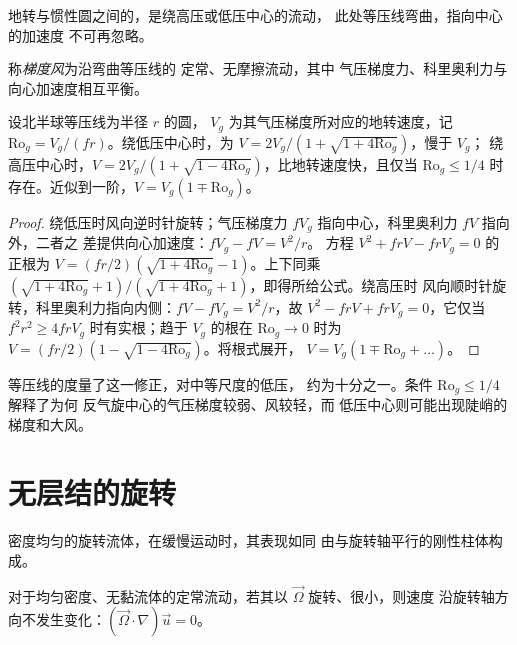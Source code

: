 地转与惯性圆之间的，是绕高压或低压中心的流动，
此处等压线弯曲，指向中心的加速度
不可再忽略。

\begin{definition}[梯度风]\label{def:b3:gfd-foundations:gradient}
称\emph{梯度风}为沿弯曲等压线的
定常、无摩擦流动，其中
气压梯度力、科里奥利力与向心加速度相互平衡。
\end{definition}

\begin{proposition}[曲率修正]\label{prop:b3:gfd-foundations:gradient}
设北半球等压线为半径 $r$ 的圆，
$V_g$ 为其气压梯度所对应的地转速度，记
$\mathrm{Ro}_g = V_g/(fr)$。绕低压中心时，为
$V = 2V_g/(1 + \sqrt{1 + 4\mathrm{Ro}_g})$，慢于 $V_g$；
绕高压中心时，$V = 2V_g/(1 + \sqrt{1 - 4\mathrm{Ro}_g})$，比地转速度快，且仅当
$\mathrm{Ro}_g \le 1/4$ 时存在。近似到一阶，$V = V_g(1 \mp \mathrm{Ro}_g)$。
\end{proposition}

\begin{proof}
绕低压时风向逆时针旋转；气压梯度力
$fV_g$ 指向中心，科里奥利力 $fV$ 指向外，二者之
差提供向心加速度：$fV_g - fV = V^2/r$。
方程 $V^2 + frV - frV_g = 0$ 的正根为 $V = (fr/2)(\sqrt{1 +
4\mathrm{Ro}_g} - 1)$。上下同乘 $(\sqrt{1 + 4\mathrm{Ro}_g} +
1)/(\sqrt{1 + 4\mathrm{Ro}_g} + 1)$，即得所给公式。绕高压时
风向顺时针旋转，科里奥利力指向内侧：$fV - fV_g =
V^2/r$，故 $V^2 - frV + frV_g = 0$，它仅当 $f^2r^2
\ge 4frV_g$ 时有实根；趋于 $V_g$ 的根在 $\mathrm{Ro}_g \to 0$ 时为
$V = (fr/2)(1 - \sqrt{1 - 4\mathrm{Ro}_g})$。将根式展开，
$V = V_g(1 \mp \mathrm{Ro}_g + \dots)$。
\end{proof}

等压线的度量了这一修正，对中等尺度的低压，
约为十分之一。条件 $\mathrm{Ro}_g \le 1/4$ 解释了为何
反气旋中心的气压梯度较弱、风较轻，而
低压中心则可能出现陡峭的梯度和大风。

\section{无层结的旋转}\label{sec:b3:gfd-foundations:taylor}

密度均匀的旋转流体，在缓慢运动时，其表现如同
由与旋转轴平行的刚性柱体构成。

\begin{theorem}[泰勒–普劳德曼]\label{thm:b3:gfd-foundations:taylor-proudman}
对于均匀密度、无黏流体的定常流动，若其以
$\vec\Omega$ 旋转、很小，则速度
沿旋转轴方向不发生变化：$(\vec\Omega\cdot\nabla)\vec u = 0$。
\end{theorem}

